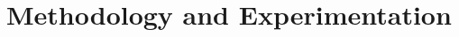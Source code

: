 \documentclass[../Thesis.tex]{subfiles}
\begin{document}
	\section{Methodology and Experimentation}
	\label{sec:methodology_and_experimentation}
\end{document}
